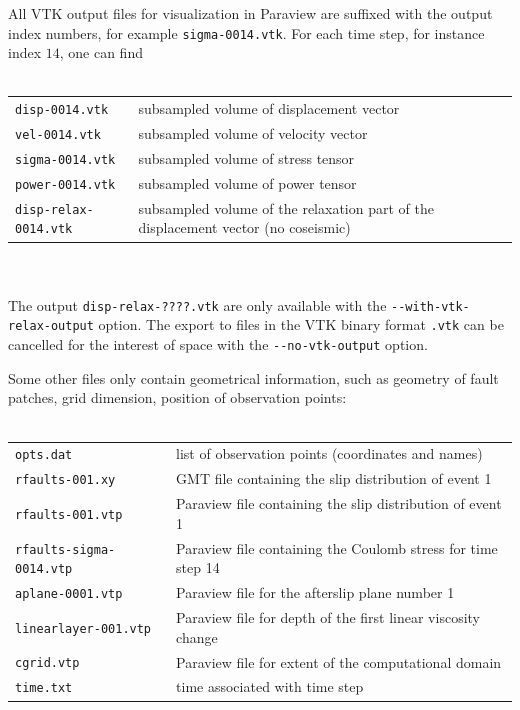 \documentclass[10pt]{article}
\begin{document}
All VTK output files for visualization in Paraview are suffixed with the output index numbers, for example \verb'sigma-0014.vtk'. For each time step, for instance index $14$, one can find\\
\\
\begin{tabular}{ll}
\verb'disp-0014.vtk' & subsampled volume of displacement vector\\
\verb'vel-0014.vtk' & subsampled volume of velocity vector\\
\verb'sigma-0014.vtk' & subsampled volume of stress tensor\\
\verb'power-0014.vtk' & subsampled volume of power tensor\\
\verb'disp-relax-0014.vtk' & subsampled volume of the relaxation part of the displacement vector (no coseismic)\\
\end{tabular}\\
\\
The output \verb'disp-relax-????.vtk' are only available with the \verb`--with-vtk-relax-output` option. The export to files in the VTK binary format \verb'.vtk' can be cancelled for the interest of space with the \verb'--no-vtk-output' option.

Some other files only contain geometrical information, such as geometry of fault patches, grid dimension, position of observation points:\\
\\
\begin{tabular}{ll}
\verb'opts.dat' & list of observation points (coordinates and names)\\
\verb'rfaults-001.xy' & GMT file containing the slip distribution of event 1\\
\verb'rfaults-001.vtp' & Paraview file containing the slip distribution of event 1\\
\verb'rfaults-sigma-0014.vtp' & Paraview file containing the Coulomb stress for time step 14\\
\verb'aplane-0001.vtp' & Paraview file for the afterslip plane number 1\\
\verb'linearlayer-001.vtp' & Paraview file for depth of the first linear viscosity change\\
\verb'cgrid.vtp' & Paraview file for extent of the computational domain\\
\verb'time.txt' &  time associated with time step\\
\end{tabular}\\
\end{document}
